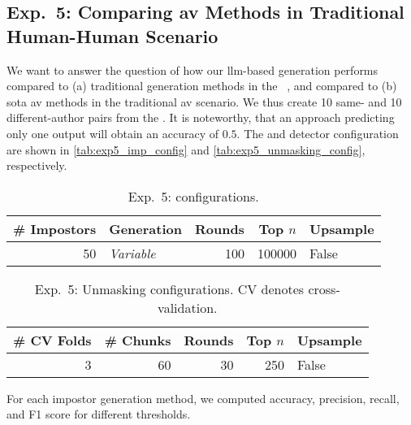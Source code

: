 \subsection{Exp.\ 5: Comparing \acs{av} Methods in Traditional Human-Human Scenario}
\label{subsec:imp_gen}

We want to answer the question of how our \ac{llm}-based \imp{} generation performs compared to (a) traditional \imp{} generation methods in the \impAppr{}~\citep{koppel_determining_2014}, and compared to (b) \acl{sota} \ac{av} methods in the traditional \ac{av} scenario.
We thus create 10 same- and 10 different-author pairs from the \dataStudent{}. %
It is noteworthy, that an approach predicting only one output will obtain an accuracy of $0.5$.
The \impAppr{} and \unmasking{} detector configuration are shown in \autoref{tab:exp5_imp_config} and \autoref{tab:exp5_unmasking_config}, respectively.

\begin{table}[h]
\centering\small
\caption{Exp.\ 5: \impAppr{} configurations.}
\label{tab:exp5_imp_config}
\begin{tabular}{@{}rlrrl@{}}   %
\toprule
\# Impostors & Generation & Rounds & Top $n$ & Upsample \\
\midrule
50 & \textit{Variable} & 100 & \num{100000} & False \\
\bottomrule
\end{tabular}%
\end{table}

\begin{table}[h]
\centering\small
\caption[Exp.\ 5: Unmasking configurations.]{Exp.\ 5: Unmasking configurations. CV denotes cross-validation.}
\label{tab:exp5_unmasking_config}
\begin{tabular}{@{}rrrrl@{}}   %
\toprule
\# CV Folds & \# Chunks & Rounds & Top $n$ & Upsample \\
\midrule
3 & 60 & 30 & \num{250} & False \\
\bottomrule
\end{tabular}%
\end{table}

For each impostor generation method, we computed accuracy, precision, recall, and F1 score for different thresholds. 
